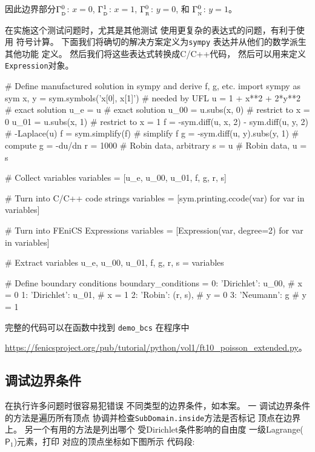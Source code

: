因此边界部分$\Gamma_{_\mathrm{D}}^0$: $x=0$, $\Gamma_{_\mathrm{D}}^1$: $x=1$,
$\Gamma_{_\mathrm{R}}^0$: $y=0$, 和 $\Gamma_{_\mathrm{N}}^0$: $y=1$。

在实施这个测试问题时，尤其是其他测试
使用更复杂的表达式的问题，有利于使用
符号计算。 下面我们将确切的解决方案定义为\texttt{sympy}
表达并从他们的数学派生其他功能
定义。 然后我们将这些表达式转换成C/C++代码，
然后可以用来定义\texttt{Expression}对象。

\begin{python}
# Define manufactured solution in sympy and derive f, g, etc.
import sympy as sym
x, y = sym.symbols('x[0], x[1]')            # needed by UFL
u = 1 + x**2 + 2*y**2                       # exact solution
u_e = u                                     # exact solution
u_00 = u.subs(x, 0)                         # restrict to x = 0
u_01 = u.subs(x, 1)                         # restrict to x = 1
f = -sym.diff(u, x, 2) - sym.diff(u, y, 2)  # -Laplace(u)
f = sym.simplify(f)                         # simplify f
g = -sym.diff(u, y).subs(y, 1)              # compute g = -du/dn
r = 1000                                    # Robin data, arbitrary
s = u                                       # Robin data, u = s

# Collect variables
variables = [u_e, u_00, u_01, f, g, r, s]

# Turn into C/C++ code strings
variables = [sym.printing.ccode(var) for var in variables]

# Turn into FEniCS Expressions
variables = [Expression(var, degree=2) for var in variables]

# Extract variables
u_e, u_00, u_01, f, g, r, s = variables

# Define boundary conditions
boundary_conditions = {0: {'Dirichlet': u_00},   # x = 0
                       1: {'Dirichlet': u_01},   # x = 1
                       2: {'Robin':     (r, s)}, # y = 0
                       3: {'Neumann':   g}}      # y = 1
\end{python}

完整的代码可以在函数中找到
\verb!demo_bcs! 在程序中
\begin{center}
\url{https://fenicsproject.org/pub/tutorial/python/vol1/ft10_poisson_extended.py}。
\end{center}

\subsection{调试边界条件}

在执行许多问题时很容易犯错误
不同类型的边界条件，如本案。 一
调试边界条件的方法是遍历所有顶点
协调并检查\texttt{SubDomain.inside}方法是否标记
顶点在边界上。 另一个有用的方法是列出哪个
受Dirichlet条件影响的自由度
一级Lagrange($\mathsf{P} _1 $)元素，打印
对应的顶点坐标如下图所示
代码段:

